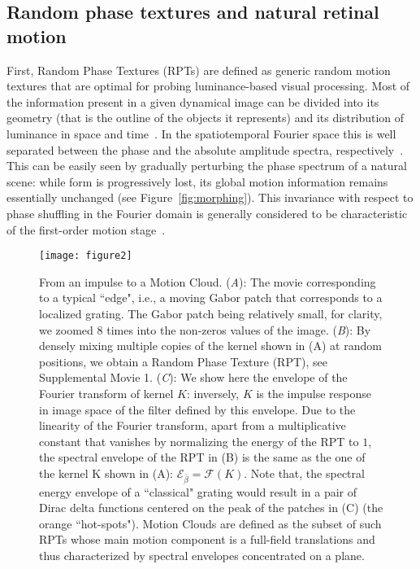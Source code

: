 \documentclass[a4paper,11pt]{article}%
\begin{document}
\subsection{Random phase textures and natural retinal motion}\label{subsection:random_phase_textures}
First, Random Phase Textures (RPTs) are defined as generic random motion textures that are optimal for probing luminance-based visual processing. Most of the information present in a given dynamical image can be divided into its geometry (that is the outline of the objects it represents) and its distribution of luminance in space and time~\citep{Neri98,Perrone01,Perrone02,Jasinschi92}. In the spatiotemporal Fourier space this is well separated between the phase and the absolute amplitude spectra, respectively~\citep{Oppenheim81}. This can be easily seen by gradually perturbing the phase spectrum of a natural scene: while form is progressively lost, its global motion information remains essentially unchanged (see Figure~\ref{fig:morphing}). This invariance with respect to phase shuffling in the Fourier domain is generally considered to be characteristic of the first-order motion stage~\citep{Lu01,Derrington04}. 

\begin{figure}%
	\texttt{[image: figure2]}%
	 \caption{From an impulse to a Motion Cloud. (\textit{A}): The movie corresponding to a typical ``edge", i.e., a moving Gabor patch that corresponds to a localized grating. The Gabor patch being relatively small, for clarity, we zoomed 8 times into the non-zeros values of the image. (\textit{B}): By densely mixing multiple copies of the kernel shown in (A) at random positions, we obtain a Random Phase Texture (RPT), see Supplemental Movie 1. (\textit{C}):  We show here the envelope of the Fourier transform of kernel $K$: inversely, $K$ is the impulse response in image space of the filter defined by this envelope. Due to the linearity of the Fourier transform, apart from a multiplicative constant that vanishes by normalizing the energy of the  RPT to $1$, the spectral envelope of the RPT in (B) is the same as the one of the kernel K shown in (A): $\mathcal{E}_{\bar{\beta}}=\mathcal{F}(K)$. Note that, the spectral energy envelope  of a ``classical" grating would result in a pair of Dirac delta functions centered on the peak of the patches in (C) (the orange ``hot-spots"). Motion Clouds are defined as the subset of such RPTs whose main motion component is a full-field translations and thus characterized by spectral envelopes concentrated on a plane.}%
	 \label{fig:impulse}
\end{figure}
\end{document}

